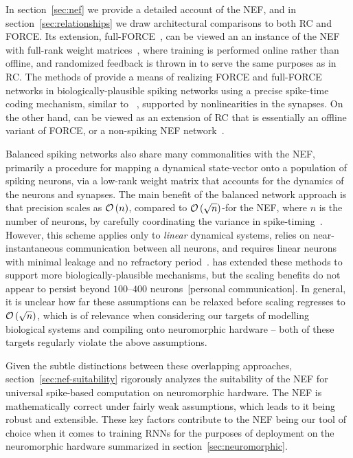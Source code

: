 In section~\ref{sec:nef} we provide a detailed account of the NEF, and in section~\ref{sec:relationships} we draw architectural comparisons to both RC and FORCE.
Its extension, full-FORCE~\citep{depasquale2018full}, can be viewed an an instance of the NEF with full-rank weight matrices~\citep{tripp2006neural}, where training is performed online rather than offline, and randomized feedback is thrown in to serve the same purposes as in RC.
The methods of \citet{thalmeier2016learning} provide a means of realizing FORCE and full-FORCE networks in biologically-plausible spiking networks using a precise spike-time coding mechanism, similar to ~\citet{boerlin2013predictive}, supported by nonlinearities in the synapses.
On the other hand, \citet{jaeger2014controlling} can be viewed as an extension of RC that is essentially an offline variant of FORCE, or a non-spiking NEF network~\citep{aubin2017}.

Balanced spiking networks also share many commonalities with the NEF, primarily a procedure for mapping a dynamical state-vector onto a population of spiking neurons, via a low-rank weight matrix that accounts for the dynamics of the neurons and synapses.
The main benefit of the balanced network approach is that precision scales as $\mathcal{O}\left({n}\right)$, compared to $\mathcal{O}\left({\sqrt{n}}\right)$-for the NEF, where $n$ is the number of neurons, by carefully coordinating the variance in spike-timing~\citep[][Figure~11]{boahen2017neuromorph}.
However, this scheme applies only to \emph{linear} dynamical systems, relies on near-instantaneous communication between all neurons, and requires linear neurons with minimal leakage and no refractory period~\citep{boerlin2013predictive}.
\citet{schwemmer2015constructing} has extended these methods to support more biologically-plausible mechanisms, but the scaling benefits do not appear to persist beyond $100$--$400$ neurons~[personal communication].
In general, it is unclear how far these assumptions can be relaxed before scaling regresses to $\mathcal{O}\left({\sqrt{n}}\right)$, which is of relevance when considering our targets of modelling biological systems and compiling onto neuromorphic hardware -- both of these targets regularly violate the above assumptions.

Given the subtle distinctions between these overlapping approaches,
section~\ref{sec:nef-suitability} rigorously analyzes the suitability of the NEF for universal spike-based computation on neuromorphic hardware.
The NEF is mathematically correct under fairly weak assumptions, which leads to it being robust and extensible.
These key factors contribute to the NEF being our tool of choice when it comes to training RNNs for the purposes of deployment on the neuromorphic hardware summarized in section~\ref{sec:neuromorphic}.

